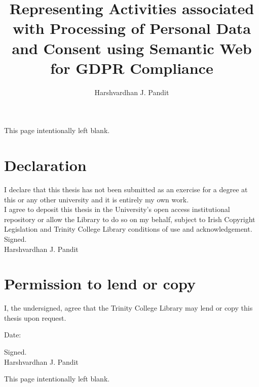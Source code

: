 \documentclass[a4paper,oneside,11pt]{book}
\title{Representing Activities associated with Processing of Personal Data and Consent using Semantic Web for GDPR Compliance}
\author{Harshvardhan J. Pandit}
\makeatletter
\def\cleardoublepage{\clearpage%
        \if@twoside
            \ifodd\c@page\else
                \vspace*{\fill}
                \hfill
                \begin{center}
                This page intentionally left blank.
                \end{center}
                \vspace{\fill}
                \thispagestyle{empty}
                \newpage
                \if@twocolumn\hbox{}\newpage\fi
            \fi
        \fi
    }
\makeatother
\begin{document}

{}


\cleardoublepage

\chapter*{Declaration}
I declare that this thesis has not been submitted as an exercise for a degree at this or any other university and it is entirely my own work. \\[1cm]
\noindent I agree to deposit this thesis in the University’s open access institutional repository or allow the Library to do so on my behalf, subject to Irish Copyright Legislation and Trinity College Library conditions of use and acknowledgement. \\[3cm]
Signed. \\
Harshvardhan J. Pandit

\chapter*{Permission to lend or copy}
I, the undersigned, agree that the Trinity College Library may lend or copy this thesis upon request.

\vspace{3cm}\noindent
Date:

\vspace{1cm}\noindent
Signed. \\
Harshvardhan J. Pandit




\cleardoublepage
\pagestyle{plain}
\tableofcontents
\listoffigures
\listoftables
\renewcommand\listoflistingscaption{List of source codes}
\listoflistings


\mainmatter
\renewcommand{\thepage}{\arabic{page}}
\setcounter{page}{1}
\linenumbers \rightlinenumbers*
\end{document}
